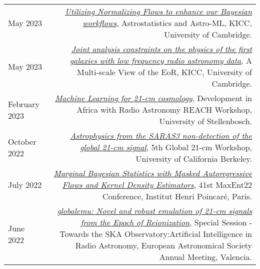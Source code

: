 \documentclass{article}
\begin{document}
\begin{tabular}{L!{\vrule}R}
    May 2023 & \href{https://github.com/htjb/Talks/blob/master/Talks/KICC_EoR/Bevins_KICC_EoR.pdf}{\textit{Utilizing Normalizing Flows to enhance our Bayesian workflows}}, Astrostatistics and Astro-ML, KICC, University of Cambridge. \\
    May 2023 & \href{https://github.com/htjb/Talks/blob/master/Talks/KICC_EoR/Bevins_KICC_EoR.pdf}{\textit{Joint analysis constraints on the physics of the first galaxies with low frequency radio astronomy data}}, A Multi-scale View of the EoR, KICC, University of Cambridge. \\
    February 2023 & \href{https://github.com/htjb/Talks/blob/master/Talks/DARA_REACH_Workshop/DARA_Workshop.pdf}{\textit{Machine Learning for 21-cm cosmology}}, Development in Africa with Radio Astronomy REACH Workshop, University of Stellenbosch. \\
    October 2022 & \href{https://global21cmworkshop.org/2022-berkeley/}{\textit{Astrophysics from the SARAS3 non-detection of the global 21-cm signal}}, 5th Global 21-cm Workshop, University of California Berkeley. \\
	July 2022 & \href{https://github.com/htjb/Talks/blob/master/Talks/MaxEnt22_margarine_June_2022/MaxEnt_slides.pdf}{\textit{Marginal Bayesian Statistics with Masked Autoregressive Flows and Kernel Density Estimators}}, 41st MaxEnt22 Conference, Institut Henri Poincar\'e, Paris. \\
	June 2022 & \href{https://github.com/htjb/Talks/blob/master/Talks/ESA_globalemu_July_2022/AUDITORIUM\%203A_SS23a_0940_Bevins.pdf}{\textit{globalemu: Novel and robust emulation of 21-cm signals from the Epoch of Reionization}}, Special Session - Towards the SKA Observatory:Artificial Intelligence in Radio Astronomy, European Astronomical Society Annual Meeting, Valencia. \\
\end{tabular}
\end{document}
